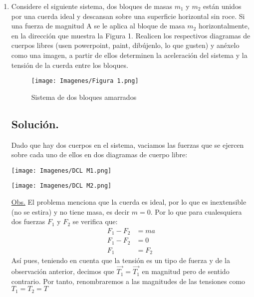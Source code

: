 \documentclass[letterpaper,12pt]{article}
\newenvironment{Figura}
{\par\medskip\noindent\minipage{\linewidth}}
  {\endminipage\par\medskip}
\begin{document}
\begin{enumerate}


    

    \item Considere el siguiente sistema, dos bloques de masas $m_1$ y $m_2$ están unidos por una cuerda ideal y descansan sobre una superficie horizontal sin roce. Si una fuerza de magnitud A se le aplica al bloque de masa $m_2$ horizontalmente, en la dirección que muestra la Figura 1. Realicen los respectivos diagramas de cuerpos libres (usen powerpoint, paint, dibújenlo, lo que gusten) y anéxelo como una imagen, a partir de ellos determinen la aceleración del sistema y la tensión de la cuerda entre los bloques.
    \begin{figure}
        \centering
        \texttt{[image: Imagenes/Figura 1.png]}
        \caption{Sistema de dos bloques amarrados}
        \label{fig:my_label}
    \end{figure}
\subsection*{Solución.}
Dado que hay dos cuerpos en el sistema, vaciamos las fuerzas que se ejercen sobre cada uno de ellos en dos diagramas de cuerpo libre:
\begin{multicols}{2}
    \begin{Figura}
        \centering
        \texttt{[image: Imagenes/DCL M1.png]}
        \label{fig:my_label}
    \end{Figura}
    \columnbreak
    \begin{Figura}
        \centering
        \texttt{[image: Imagenes/DCL M2.png]}
        \label{fig:my_label}
    \end{Figura}
\end{multicols}

\underline{Obs.} El problema menciona que la cuerda es ideal, por lo que es inextensible (no se estira) y no tiene masa, es decir $m=0$. Por lo que para cualesquiera dos fuerzas $F_1$ y $F_2$ se verifica que:
    \begin{align*}
        F_1 - F_2 &= ma\\
        F_1 - F_2 &= 0\\
        F_1  &= F_2
    \end{align*}
\hypertarget{uwu}{Así pues}, teniendo en cuenta que la tensión es un tipo de fuerza y de la observación anterior, decimos que $\vec{T_1} = \vec{T_1}$ en magnitud pero de sentido contrario. Por tanto, renombraremos a las magnitudes de las tensiones como $T_1= T_2 =T$


\end{enumerate}
\end{document}
